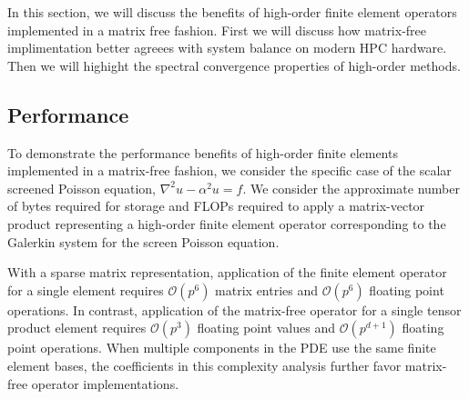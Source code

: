 In this section, we will discuss the benefits of high-order finite element operators implemented in a matrix free fashion.
First we will discuss how matrix-free implimentation better agreees with system balance on modern HPC hardware.
Then we will highight the spectral convergence properties of high-order methods.

\subsection{Performance}

To demonstrate the performance benefits of high-order finite elements implemented in a matrix-free fashion, we consider the specific case of the scalar screened Poisson equation, $\nabla^2 u - \alpha^2 u = f$.
We consider the approximate number of bytes required for storage and FLOPs required to apply a matrix-vector product representing a high-order finite element operator corresponding to the Galerkin system for the screen Poisson equation.

With a sparse matrix representation, application of the finite element operator for a single element requires $\mathcal{O} \left( p^6 \right)$ matrix entries and $\mathcal{O} \left( p^6 \right)$ floating point operations.
In contrast, application of the matrix-free operator for a single tensor product element requires $\mathcal{O} \left( p^3 \right)$ floating point values and $\mathcal{O} \left( p^{d + 1} \right)$ floating point operations.
When multiple components in the PDE use the same finite element bases, the coefficients in this complexity analysis further favor matrix-free operator implementations.

